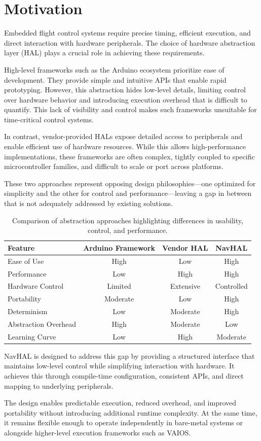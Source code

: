 \section{Motivation}
\label{sec:navhal_motivation}

Embedded flight control systems require precise timing, efficient execution, and direct interaction with hardware peripherals. The choice of hardware abstraction layer (HAL) plays a crucial role in achieving these requirements.

High-level frameworks such as the Arduino ecosystem prioritize ease of development. They provide simple and intuitive APIs that enable rapid prototyping. However, this abstraction hides low-level details, limiting control over hardware behavior and introducing execution overhead that is difficult to quantify. This lack of visibility and control makes such frameworks unsuitable for time-critical control systems.

In contrast, vendor-provided HALs expose detailed access to peripherals and enable efficient use of hardware resources. While this allows high-performance implementations, these frameworks are often complex, tightly coupled to specific microcontroller families, and difficult to scale or port across platforms.

These two approaches represent opposing design philosophies—one optimized for simplicity and the other for control and performance—leaving a gap in between that is not adequately addressed by existing solutions.

\begin{table}[H]
\centering
\begin{tabular}{|l|c|c|c|}
\hline
\textbf{Feature} & \textbf{Arduino Framework} & \textbf{Vendor HAL} & \textbf{NavHAL} \\
\hline
Ease of Use & High & Low & High \\
\hline
Performance & Low & High & High \\
\hline
Hardware Control & Limited & Extensive & Controlled \\
\hline
Portability & Moderate & Low & High \\
\hline
Determinism & Low & Moderate & High \\
\hline
Abstraction Overhead & High & Moderate & Low \\
\hline
Learning Curve & Low & High & Moderate \\
\hline
\end{tabular}
\caption{Comparison of abstraction approaches highlighting differences in usability, control, and performance.}
\label{tab:hal_comparison}
\end{table}

NavHAL is designed to address this gap by providing a structured interface that maintains low-level control while simplifying interaction with hardware. It achieves this through compile-time configuration, consistent APIs, and direct mapping to underlying peripherals.

The design enables predictable execution, reduced overhead, and improved portability without introducing additional runtime complexity. At the same time, it remains flexible enough to operate independently in bare-metal systems or alongside higher-level execution frameworks such as VAIOS.